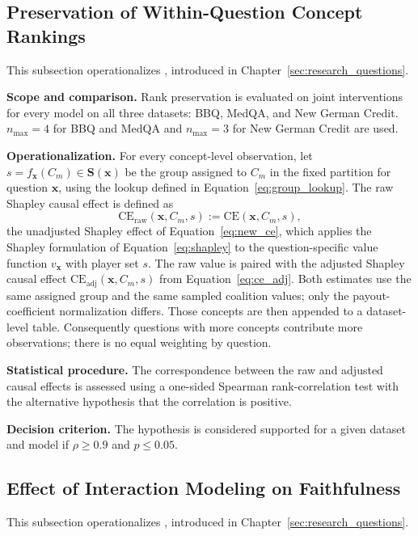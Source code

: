 \subsection{Preservation of Within-Question Concept Rankings}
\label{sec:methodology-preservation}
This subsection operationalizes , introduced in Chapter~\ref{sec:research_questions}.

\noindent\textbf{Scope and comparison.} Rank preservation is evaluated on joint interventions for every model on all three datasets: BBQ, MedQA, and New German Credit. $n_{\max}=4$ for BBQ and MedQA and $n_{\max}=3$ for New German Credit are used.

\noindent\textbf{Operationalization.} For every concept-level observation, let $s=f_{\mathbf{x}}(C_m)\in\mathbf{S}(\mathbf{x})$ be the group assigned to $C_m$ in the fixed partition for question $\mathbf{x}$, using the lookup defined in Equation~\ref{eq:group_lookup}. The raw Shapley causal effect is defined as
\begin{equation}
	\mathrm{CE}_{\mathrm{raw}}(\mathbf{x},C_m,s) := \mathrm{CE}(\mathbf{x},C_m,s),
\end{equation}
the unadjusted Shapley effect of Equation~\ref{eq:new_ce}, which applies the Shapley formulation of Equation~\ref{eq:shapley} to the question-specific value function $v_{\mathbf{x}}$ with player set $s$. The raw value is paired with the adjusted Shapley causal effect $\mathrm{CE}_{\mathrm{adj}}(\mathbf{x},C_m,s)$ from Equation~\ref{eq:ce_adj}. Both estimates use the same assigned group and the same sampled coalition values; only the payout-coefficient normalization differs. Those concepts are then appended to a dataset-level table. Consequently questions with more concepts contribute more observations; there is no equal weighting by question.

\noindent\textbf{Statistical procedure.} The correspondence between the raw and adjusted causal effects is assessed using a one-sided Spearman rank-correlation test with the alternative hypothesis that the correlation is positive.

\noindent\textbf{Decision criterion.} The hypothesis is considered supported for a given dataset and model if $\rho \ge 0.9$ and $p \le 0.05$.

\subsection{Effect of Interaction Modeling on Faithfulness}
This subsection operationalizes , introduced in Chapter~\ref{sec:research_questions}.

